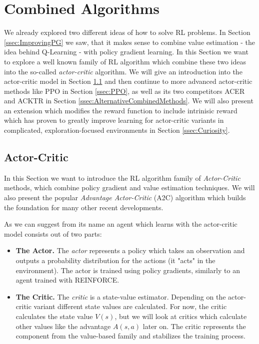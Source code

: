 \section{Combined Algorithms} \label{sec:CombinedMethods}
We already explored two different ideas of how to solve RL problems. In Section \ref{ssec:ImprovingPG} we saw, that it makes sense to combine value estimation - the idea behind Q-Learning - with policy gradient learning. In this Section we want to explore a well known family of RL algorithm which combine these two ideas into the so-called \textit{actor-critic} algorithm. We will give an introduction into the actor-critic model in Section \ref{ssec:A2C} and then continue to more advanced actor-critic methods like PPO in Section \ref{ssec:PPO}, as well as its two competitors ACER and ACKTR in Section \ref{ssec:AlternativeCombinedMethods}. We will also present an extension which modifies the reward function to include intrinisic reward which has proven to greatly improve learning for actor-critic variants in complicated, exploration-focused environments in Section \ref{ssec:Curiosity}. 

\subsection{Actor-Critic} \label{ssec:A2C}
In this Section we want to introduce the RL algorithm family of \textit{Actor-Critic} methods, which combine policy gradient and value estimation techniques. We will also present the popular \textit{Advantage Actor-Critic} (A2C) algorithm which builds the foundation for many other recent developments. 

As we can suggest from its name an agent which learns with the actor-critic model consists out of two parts: 
\begin{itemize}
  \item \textbf{The Actor.} The \textit{actor} represents a policy which takes an observation and outputs a probability distribution for the actions (it "acts" in the environment). The actor is trained using policy gradients, similarly to an agent trained with REINFORCE. 
  \item \textbf{The Critic.} The \textit{critic} is a state-value estimator. Depending on the actor-critic variant different state values are calculated. For now, the critic calculates the state value $V(s)$, but we will look at critics which calculate other values like the advantage $A(s, a)$ later on. The critic represents the component from the value-based family and stabilizes the training process.   
\end{itemize}

